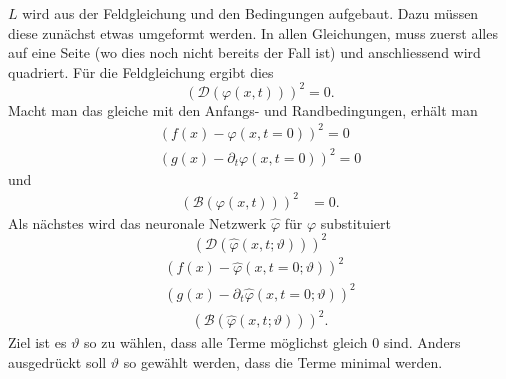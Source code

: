 \( L \) wird aus der Feldgleichung und den Bedingungen aufgebaut. Dazu müssen diese zunächst etwas umgeformt werden.
In allen Gleichungen, muss zuerst alles auf eine Seite (wo dies noch nicht bereits der Fall ist) und anschliessend wird quadriert.
Für die Feldgleichung ergibt dies
\begin{equation}
    \left(\mathcal{D}(\varphi(x, t))\right)^2 = 0.
    \label{neuronal:feldgleichung_umformuliert}
\end{equation}
Macht man das gleiche mit den Anfangs- und Randbedingungen, erhält man
\begin{equation}
    \begin{aligned}
        \left(f(x) - \varphi(x, t = 0)\right)^2 = 0\\
        \left(g(x) - \partial_t \varphi(x, t = 0)\right)^2 = 0
    \end{aligned}
    \label{neuronal:anfangsbedingung_umformuliert}
\end{equation}
und
\begin{equation}
    \begin{aligned}
        \left(\mathcal{B}(\varphi(x, t))\right)^2 &= 0.
    \end{aligned}
    \label{neuronal:randbedingung_umformuliert}
\end{equation}
Als nächstes wird das neuronale Netzwerk $\hat{\varphi}$ für $\varphi$ substituiert
\begin{equation}
    \left(\mathcal{D}(\hat{\varphi}(x, t; \vartheta))\right)^2
    \label{neuronal:feldgleichung_umformuliert_netz}
\end{equation}
\begin{equation}
    \begin{aligned}
        \left(f(x) - \hat{\varphi}(x, t = 0; \vartheta)\right)^2\\
        \left(g(x) - \partial_t \hat{\varphi}(x, t = 0; \vartheta)\right)^2
    \end{aligned}
    \label{neuronal:anfangsbedingung_umformuliert_netz}
\end{equation}
\begin{equation}
    \begin{aligned}
        \left(\mathcal{B}(\hat{\varphi}(x, t; \vartheta))\right)^2.
    \end{aligned}
    \label{neuronal:randbedingung_umformuliert_netz}
\end{equation}
Ziel ist es $\vartheta$ so zu wählen, dass alle Terme möglichst gleich 0 sind.
Anders ausgedrückt soll $\vartheta$ so gewählt werden, dass die Terme minimal werden.

